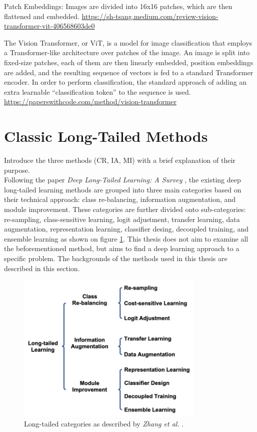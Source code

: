 Patch Embeddings: Images are divided into 16x16 patches, which are then flattened and embedded.
\url{https://sh-tsang.medium.com/review-vision-transformer-vit-406568603de0}

The Vision Transformer, or ViT, is a model for image classification that employs a Transformer-like architecture over patches of the image. An image is split into fixed-size patches, each of them are then linearly embedded, position embeddings are added, and the resulting sequence of vectors is fed to a standard Transformer encoder. In order to perform classification, the standard approach of adding an extra learnable “classification token” to the sequence is used.
\url{https://paperswithcode.com/method/vision-transformer}


\section{Classic Long-Tailed Methods}
\label{sec:lt_methods}
Introduce the three methods (CR, IA, MI) with a brief explanation of their purpose.\\

Following the paper \textit{Deep Long-Tailed Learning: A Survey} \cite{zhang2023deep}, the existing deep long-tailed learning methods are grouped into three main categories based on their technical approach: class re-balancing, information augmentation, and module improvement. These categories are further divided onto sub-categories: re-sampling, class-sensitive learning, logit adjustment, transfer learning, data augmentation, representation learning, classifier desing, decoupled training, and ensemble learning as shown on figure \ref{fig:lt_main_categories}. This thesis does not aim to examine all the beforementioned method, but aims to find a deep learning approach to a specific problem. The backgrounds of the methods used in this thesis are described in this section.

\begin{figure}[ht]
    \centering
    \includegraphics[width=0.8\textwidth]{Images/lt_methods_categories.png} 
    \caption{Long-tailed categories as described by \textit{Zhang et al.} \cite{zhang2023deep}.}
    \label{fig:lt_main_categories} %
\end{figure}

